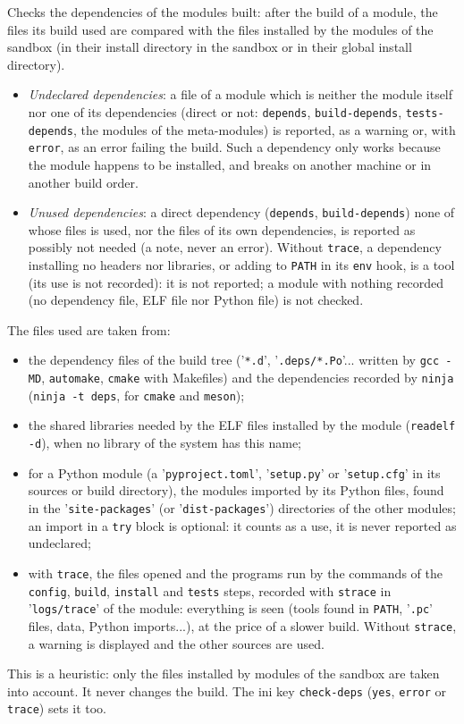 \documentclass[a4paper,12pt,twoside]{article}
\newcommand{\code}[1]{\texttt{#1}}
\renewcommand{\emph}[1]{\textit{#1}}
\newcommand{\file}[1]{'{\texttt{#1}}'}
\newcommand{\ddash}{-{}-}
\begin{document}
\begin{description}[font=\texttt]
	\item[\ddash{}check-deps{[}:error|:trace{]}] \label{check-deps}Checks the dependencies of the modules built: after the build of a module, the files its build used are compared with the files installed by the modules of the sandbox (in their install directory in the sandbox or in their global install directory).
	\begin{itemize}
		\item \emph{Undeclared dependencies}: a file of a module which is neither the module itself nor one of its dependencies (direct or not: \code{depends}, \code{build-depends}, \code{tests-depends}, the modules of the meta-modules) is reported, as a warning or, with \code{error}, as an error failing the build. Such a dependency only works because the module happens to be installed, and breaks on another machine or in another build order.
		\item \emph{Unused dependencies}: a direct dependency (\code{depends}, \code{build-depends}) none of whose files is used, nor the files of its own dependencies, is reported as possibly not needed (a note, never an error). Without \code{trace}, a dependency installing no headers nor libraries, or adding to \code{PATH} in its \code{env} hook, is a tool (its use is not recorded): it is not reported; a module with nothing recorded (no dependency file, ELF file nor Python file) is not checked.
	\end{itemize}
	The files used are taken from:
	\begin{itemize}
		\item the dependency files of the build tree (\file{*.d}, \file{.deps/*.Po}... written by \code{gcc -MD}, \code{automake}, \code{cmake} with Makefiles) and the dependencies recorded by \code{ninja} (\code{ninja -t deps}, for \code{cmake} and \code{meson});
		\item the shared libraries needed by the ELF files installed by the module (\code{readelf -d}), when no library of the system has this name;
		\item for a Python module (a \file{pyproject.toml}, \file{setup.py} or \file{setup.cfg} in its sources or build directory), the modules imported by its Python files, found in the \file{site-packages} (or \file{dist-packages}) directories of the other modules; an import in a \code{try} block is optional: it counts as a use, it is never reported as undeclared;
		\item with \code{trace}, the files opened and the programs run by the commands of the \code{config}, \code{build}, \code{install} and \code{tests} steps, recorded with \code{strace} in \file{logs/trace} of the module: everything is seen (tools found in \code{PATH}, \file{.pc} files, data, Python imports...), at the price of a slower build. Without \code{strace}, a warning is displayed and the other sources are used.
	\end{itemize}
	This is a heuristic: only the files installed by modules of the sandbox are taken into account. It never changes the build. The ini key \code{check-deps} (\code{yes}, \code{error} or \code{trace}) sets it too.


\end{description}
\end{document}
